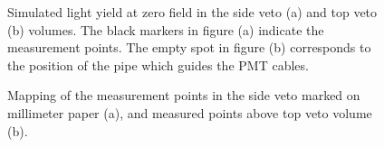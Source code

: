 \begin{figure}[!h]
\centering
{}
\caption[Simulated light yield at zero field in the side veto and top veto volumes]{Simulated light yield at zero field in the side veto (a) and top veto (b) volumes. The black markers in figure (a) indicate the measurement points. The empty spot in figure (b) corresponds to the position of the pipe which guides the PMT cables.}
\label{figLCEvetoMC}
\end{figure}

\begin{figure}[!h]
\centering
{}
\caption[Mapping of the measurement points in the side veto marked on millimeter paper, and measured points above top veto volume]{Mapping of the measurement points in the side veto marked on millimeter paper (a), and measured points above top veto volume (b).}
\label{figVetoMapping}
\end{figure}


